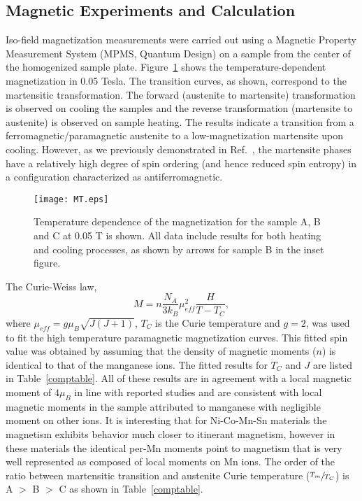 \documentclass[sort&compress,twocolumn,3p]{elsarticle}
\begin{document}
\subsection{Magnetic Experiments and Calculation}
Iso-field magnetization measurements were carried out using a Magnetic Property Measurement System (MPMS, Quantum Design) on a sample from the center of the homogenized sample plate.
Figure~\ref{mt} shows the temperature-dependent magnetization in 0.05 Tesla.
The transition curves, as shown, correspond to the martensitic transformation. 
The forward (austenite to martensite) transformation is observed on cooling the samples and the reverse transformation (martensite to austenite) is observed on sample heating. 
The results indicate a transition from a ferromagnetic/paramagnetic austenite to a low-magnetization martensite upon cooling.
However, as we previously demonstrated in Ref.~\cite{Chen2016176}, the martensite phases have a relatively high degree of spin ordering (and hence reduced spin entropy) in a configuration characterized as antiferromagnetic.
\begin{figure}
\texttt{[image: MT.eps]}
\caption{Temperature dependence of the magnetization for the sample A, B and C at 0.05 T is shown.
All data include results for both heating and cooling processes, as shown by arrows for	sample B in the inset figure.}
\label{mt}
\end{figure}

The Curie-Weiss law,
\begin{equation}
M=n\frac{N_A}{3k_B}\mu_{eff}^2\frac{H}{T-T_C},
\end{equation}
where $\mu_{eff}=g\mu_B\sqrt{J(J+1)}$, $T_C$ is the Curie temperature and $g=2$,
was used to fit the high temperature paramagnetic magnetization curves.
This fitted spin value was obtained by assuming that the density of magnetic moments ($n$) is identical to that of the manganese ions.
The fitted results for $T_C$ and $J$ are listed in Table~\ref{comptable}.
All of these results are in agreement with a local magnetic moment of $4\mu_B$ in line with reported studies\cite{Li201335,0953-8984-21-23-233201,PhysRevB.86.214205,:/content/aip/journal/apl/97/24/10.1063/1.3525168} 
and are consistent with local magnetic moments in the sample attributed to manganese with negligible moment on other ions.
It is interesting that for Ni-Co-Mn-Sn materials\cite{doi:10.1063/1.4960353} the magnetism exhibits behavior much closer to itinerant magnetism, however in these materials the identical per-Mn moments point to magnetism that is very well represented as composed of local moments on Mn ions.
The order of the ratio between martensitic transition and austenite Curie temperature ($\sfrac{T_{m}}{T_C}$) is A $>$ B $>$ C as shown in Table~\ref{comptable}.
\end{document}
